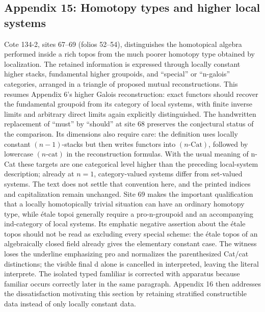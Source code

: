 \documentclass[10pt,oneside]{book}
\begin{document}
\subsection*{Appendix 15: Homotopy types and higher local systems}
Cote 134-2, sites 67--69 (folios 52--54), distinguishes the homotopical algebra performed inside a rich topos from the much poorer homotopy type obtained by localization. The retained information is expressed through locally constant higher stacks, fundamental higher groupoids, and ``special'' or ``n-galois'' categories, arranged in a triangle of proposed mutual reconstructions. This resumes Appendix 6's higher Galois reconstruction: exact functors should recover the fundamental groupoid from its category of local systems, with finite inverse limits and arbitrary direct limits again explicitly distinguished. The handwritten replacement of ``must'' by ``should'' at site 68 preserves the conjectural status of the comparison. Its dimensions also require care: the definition uses locally constant $(n-1)$-stacks but then writes functors into $(n\text{-}\mathrm{Cat})$, followed by lowercase $(n\text{-}\mathrm{cat})$ in the reconstruction formulas. With the usual meaning of n-Cat these targets are one categorical level higher than the preceding local-system description; already at $n=1$, category-valued systems differ from set-valued systems. The text does not settle that convention here, and the printed indices and capitalization remain unchanged. Site 69 makes the important qualification that a locally homotopically trivial situation can have an ordinary homotopy type, while étale topoi generally require a pro-n-groupoid and an accompanying ind-category of local systems. Its emphatic negative assertion about the étale topos should not be read as excluding every special scheme: the étale topos of an algebraically closed field already gives the elementary constant case. The witness loses the underline emphasizing pro and normalizes the parenthesized Cat/cat distinctions; the visible final d alone is cancelled in interpreted, leaving the literal interprete. The isolated typed famliliar is corrected with apparatus because familiar occurs correctly later in the same paragraph. Appendix 16 then addresses the dissatisfaction motivating this section by retaining stratified constructible data instead of only locally constant data.
\end{document}
